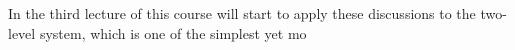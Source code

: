 In the third lecture of this course will start to apply these discussions to the two-level system, which is one of the simplest yet mo